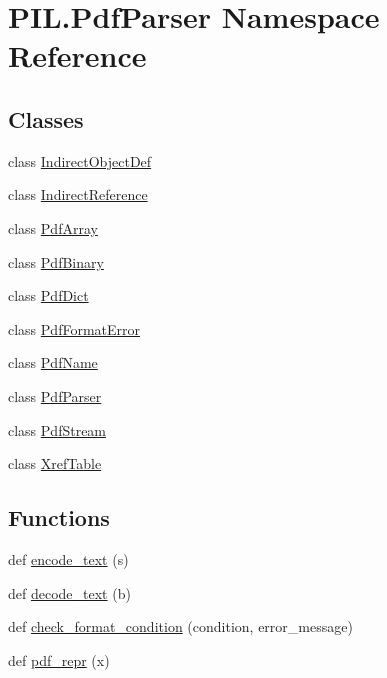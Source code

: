 \hypertarget{namespacePIL_1_1PdfParser}{}\section{P\+I\+L.\+Pdf\+Parser Namespace Reference}
\label{namespacePIL_1_1PdfParser}
\subsection*{Classes}
\begin{DoxyCompactItemize}
\item 
class \hyperlink{classPIL_1_1PdfParser_1_1IndirectObjectDef}{Indirect\+Object\+Def}
\item 
class \hyperlink{classPIL_1_1PdfParser_1_1IndirectReference}{Indirect\+Reference}
\item 
class \hyperlink{classPIL_1_1PdfParser_1_1PdfArray}{Pdf\+Array}
\item 
class \hyperlink{classPIL_1_1PdfParser_1_1PdfBinary}{Pdf\+Binary}
\item 
class \hyperlink{classPIL_1_1PdfParser_1_1PdfDict}{Pdf\+Dict}
\item 
class \hyperlink{classPIL_1_1PdfParser_1_1PdfFormatError}{Pdf\+Format\+Error}
\item 
class \hyperlink{classPIL_1_1PdfParser_1_1PdfName}{Pdf\+Name}
\item 
class \hyperlink{classPIL_1_1PdfParser_1_1PdfParser}{Pdf\+Parser}
\item 
class \hyperlink{classPIL_1_1PdfParser_1_1PdfStream}{Pdf\+Stream}
\item 
class \hyperlink{classPIL_1_1PdfParser_1_1XrefTable}{Xref\+Table}
\end{DoxyCompactItemize}
\subsection*{Functions}
\begin{DoxyCompactItemize}
\item 
def \hyperlink{namespacePIL_1_1PdfParser_ae866610aa4b1523dfc63e9405e9821b3}{encode\+\_\+text} (s)
\item 
def \hyperlink{namespacePIL_1_1PdfParser_a1f7c210da7775bfff40ab7ed79bc5676}{decode\+\_\+text} (b)
\item 
def \hyperlink{namespacePIL_1_1PdfParser_a0eb5f981c83619137dae72cbab33e39f}{check\+\_\+format\+\_\+condition} (condition, error\+\_\+message)
\item 
def \hyperlink{namespacePIL_1_1PdfParser_a6358d8f277294974076fe8895e941ce2}{pdf\+\_\+repr} (x)
\end{DoxyCompactItemize}
